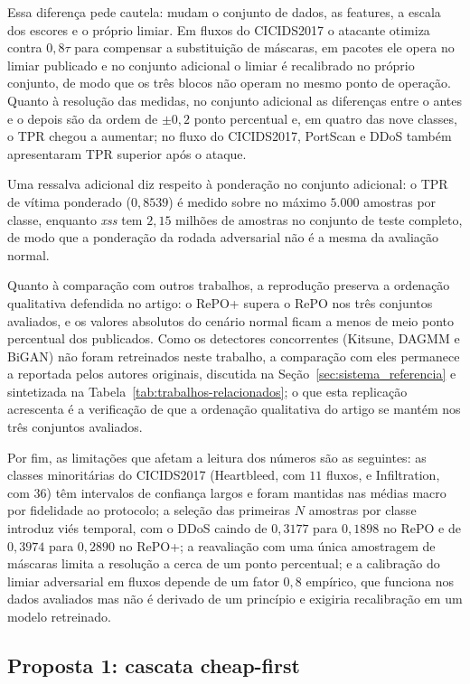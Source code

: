 \documentclass[conference]{IEEEtran}
\begin{document}
Essa diferença pede cautela: mudam o conjunto de dados, as features, a escala dos escores e o próprio limiar.
Em fluxos do CICIDS2017 o atacante otimiza contra $0{,}8\tau$ para compensar a substituição de máscaras, em pacotes ele opera no limiar publicado e no conjunto adicional o limiar é recalibrado no próprio conjunto, de modo que os três blocos não operam no mesmo ponto de operação.
Quanto à resolução das medidas, no conjunto adicional as diferenças entre o antes e o depois são da ordem de $\pm 0{,}2$ ponto percentual e, em quatro das nove classes, o TPR chegou a aumentar; no fluxo do CICIDS2017, PortScan e DDoS também apresentaram TPR superior após o ataque.

Uma ressalva adicional diz respeito à ponderação no conjunto adicional: o TPR de vítima ponderado ($0{,}8539$) é medido sobre no máximo $5.000$ amostras por classe, enquanto \textit{xss} tem $2{,}15$ milhões de amostras no conjunto de teste completo, de modo que a ponderação da rodada adversarial não é a mesma da avaliação normal.

Quanto à comparação com outros trabalhos, a reprodução preserva a ordenação qualitativa defendida no artigo: o RePO+ supera o RePO nos três conjuntos avaliados, e os valores absolutos do cenário normal ficam a menos de meio ponto percentual dos publicados.
Como os detectores concorrentes (Kitsune, DAGMM e BiGAN) não foram retreinados neste trabalho, a comparação com eles permanece a reportada pelos autores originais, discutida na Seção~\ref{sec:sistema_referencia} e sintetizada na Tabela~\ref{tab:trabalhos-relacionados}; o que esta replicação acrescenta é a verificação de que a ordenação qualitativa do artigo se mantém nos três conjuntos avaliados.

Por fim, as limitações que afetam a leitura dos números são as seguintes: as classes minoritárias do CICIDS2017 (Heartbleed, com $11$ fluxos, e Infiltration, com $36$) têm intervalos de confiança largos e foram mantidas nas médias macro por fidelidade ao protocolo; a seleção das primeiras $N$ amostras por classe introduz viés temporal, com o DDoS caindo de $0{,}3177$ para $0{,}1898$ no RePO e de $0{,}3974$ para $0{,}2890$ no RePO+; a reavaliação com uma única amostragem de máscaras limita a resolução a cerca de um ponto percentual; e a calibração do limiar adversarial em fluxos depende de um fator $0{,}8$ empírico, que funciona nos dados avaliados mas não é derivado de um princípio e exigiria recalibração em um modelo retreinado.

\subsection{Proposta 1: cascata cheap-first}
\end{document}
